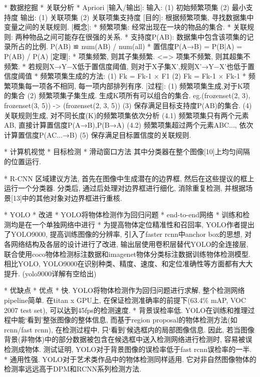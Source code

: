* 数据挖掘
	* 关联分析
		* Apriori
			[输入/输出]:
				输入: (1) 初始频繁项集	(2) 最小支持度
				输出: (1) 关联项集		(2) 关联项集支持度
			[目的]: 根据频繁项集, 寻找数据集中变量之间的关联规则.
			[概念]:
				* 频繁项集: 经常出现在一块的物品的集合.
				* 关联规则: 两种物品之间可能存在很强的关系.
				* 支持度P(AB): 数据集中包含该项集的记录所占的比例. P(AB) ≌ num(AB) / num(all)
				* 置信度P(A→B) = P(B|A) = P(AB) / P(A)
			[定理]:
				* 项集频繁, 则其子集频繁. <=> 项集不频繁, 则其超集不频繁.
				* 若规则X→Y−X低于置信度阈值, 则对于X子集X',规则X'→Y−X'也低于置信度阈值
				* 频繁项集生成的方法:
					(1) Fk = Fk-1 × F1
					(2) Fk = Fk-1 × Fk-1
				* 频繁项集每一项各不相同,  每一项内部排列有序.
			[过程]:
				(1) 频繁项集生成,对于K项的集合
					(2) 频繁项集子集生成. 生成K项所有可以组合的集合. eg.(frozenset({2, 3}), frozenset({3, 5})) -> (frozenset({2, 3, 5}))
					(3) 保存满足目标支持度P(AB)的集合.
				(4)  关联规则生成, 对不同长度(K)的频繁项集依次分析
					(4.1) 频繁项集只有两个元素{AB}, 直接计算置信度P(A→B),P(B→A)
					(4.2) 频繁项集超过两个元素{ABC...}, 依次计算置信度P(AC...→B)
					(5) 保存满足目标置信度的关联规则.


					
* 计算机视觉
	* 目标检测
		* 滑动窗口方法
			其中分类器在整个图像[10]上均匀间隔的位置运行. 

		* R-CNN
			区域建议方法, 首先在图像中生成潜在的边界框, 然后在这些提议的框上运行一个分类器. 分类后, 通过后处理对边界框进行细化, 消除重复检测, 并根据场景[13]中的其他对象对边界框进行重核. 

		* YOLO
			* 改进
				* YOLO将物体检测作为回归问题
				* end-to-end网络
				* 训练和检测均是在一个单独网络中进行
				* 为提高物体定位精准性和召回率, YOLO作者提出了YOLO9000, 提高训练图像的分辨率, 引入了faster rcnn中anchor box的思想, 对各网络结构及各层的设计进行了改进, 输出层使用卷积层替代YOLO的全连接层, 联合使用coco物体检测标注数据和imagenet物体分类标注数据训练物体检测模型. 相比YOLO, YOLO9000在识别种类、精度、速度、和定位准确性等方面都有大大提升. (yolo9000详解有空给出)

			* 优缺点
				* 优点
					* 快. YOLO将物体检测作为回归问题进行求解, 整个检测网络pipeline简单. 在titan x GPU上, 在保证检测准确率的前提下(63.4\% mAP, VOC 2007 test set), 可以达到45fps的检测速度. 
					* 背景误检率低. YOLO在训练和推理过程中能‘看到’整张图像的整体信息, 而基于region proposal的物体检测方法(如rcnn/fast rcnn), 在检测过程中, 只‘看到’候选框内的局部图像信息. 因此, 若当图像背景(非物体)中的部分数据被包含在候选框中送入检测网络进行检测时, 容易被误检测成物体. 测试证明, YOLO对于背景图像的误检率低于fast rcnn误检率的一半. 
					* 通用性强. YOLO对于艺术类作品中的物体检测同样适用. 它对非自然图像物体的检测率远远高于DPM和RCNN系列检测方法. 

